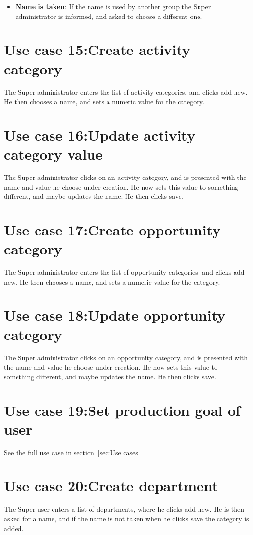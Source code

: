 \begin{itemize}
  \item \textbf{Name is taken}: If the name is used by another group the Super administrator is informed, and asked to choose a different one.
\end{itemize}

\section{Use case 15:Create activity category }
The Super administrator enters the list of activity categories, and clicks add new. He then chooses a name, and sets a numeric value for the category.

\section{Use case 16:Update activity category value }
The Super administrator clicks on an activity category, and is presented with the name and value he choose under creation. He now sets this value to something different, and maybe updates the name. He then clicks save.

\section{Use case 17:Create opportunity category }
The Super administrator enters the list of opportunity categories, and clicks add new. He then chooses a name, and sets a numeric value for the category.


\section{Use case 18:Update opportunity category }
The Super administrator clicks on an opportunity category, and is presented with the name and value he choose under creation. He now sets this value to something different, and maybe updates the name. He then clicks save.

\section{Use case 19:Set production goal of user }
See the full use case in section~\ref{sec:Use cases}

\section{Use case 20:Create department }
The Super user enters a list of departments, where he clicks add new. He is then asked for a name, and if the name is not taken when he clicks save the category is added.

